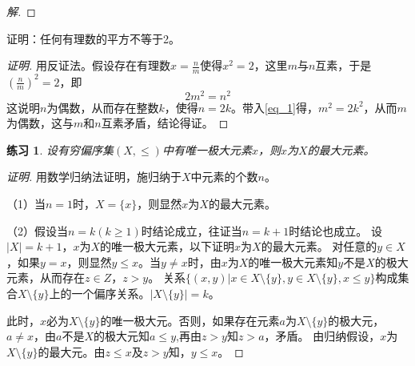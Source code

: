 \documentclass{book}[oneside]
\newtheorem{Exercise}{练习}[chapter]
\begin{document}
\begin{CJK*}{UTF8}{gbsn}
\begin{proof}[解]
  \end{proof}
  
  证明：任何有理数的平方不等于2。
\begin{proof}[证明]
  用反证法。假设存在有理数$x=\frac{n}{m}$使得$x^2=2$，这里$m$与$n$互素，于是$(\frac{n}{m})^2=2$，即
  \begin{equation}\label{eq_1}
    2m^2=n^2
  \end{equation}
  这说明$n$为偶数，从而存在整数$k$，使得$n=2k$。带入\eqref{eq_1}得，$m^2=2k^2$，从而$m$为偶数，这与$m$和$n$互素矛盾，结论得证。
\end{proof}

\begin{Exercise}
  设有穷偏序集$(X,\leq)$中有唯一极大元素$x$，则$x$为$X$的最大元素。
  \end{Exercise}
\begin{proof}[证明]
用数学归纳法证明，施归纳于$X$中元素的个数$n$。

（1）当$n=1$时，$X=\{x\}$，则显然$x$为$X$的最大元素。

（2）假设当$n=k(k\geq 1)$时结论成立，往证当$n=k+1$时结论也成立。
设$|X|=k+1$，$x$为$X$的唯一极大元素，以下证明$x$为$X$的最大元素。
对任意的$y\in X$，如果$y=x$，则显然$y\leq x$。当$y\neq x$时，由$x$为$X$的唯一极大元素知$y$不是$X$的极大元素，从而存在$z\in Z$，$z>y$。
关系$\{(x,y)|x\in X\setminus \{y\}, y\in X\setminus \{y\}, x\leq y\}$构成集合$X\setminus \{y\}$上的一个偏序关系。$|X\setminus \{y\}|=k$。

此时，$x$必为$X\setminus \{y\}$的唯一极大元。否则，如果存在元素$a$为$X\setminus \{y\}$的极大元，$a\neq x$，由$a$不是$X$的极大元知$a\leq y$,再由$z>y$知$z>a$，矛盾。
由归纳假设，$x$为$X\setminus \{y\}$的最大元。由$z\leq x$及$z>y$知，$y\leq x$。
\end{proof}  
\chapter{}

\end{CJK*}
\end{document}

